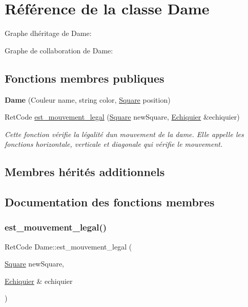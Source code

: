 \hypertarget{classDame}{}\section{Référence de la classe Dame}
\label{classDame}


Graphe d\textquotesingle{}héritage de Dame\+:


Graphe de collaboration de Dame\+:
\subsection*{Fonctions membres publiques}
\begin{DoxyCompactItemize}
\item 
\mbox{\label{classDame_ad4f00673b0a287a0ddf92682221fc961}} 
{\bfseries Dame} (Couleur name, string color, \hyperlink{classSquare}{Square} position)
\item 
Ret\+Code \hyperlink{classDame_a035c96c1763d0d111a4b4cde9678e75f}{est\+\_\+mouvement\+\_\+legal} (\hyperlink{classSquare}{Square} new\+Square, \hyperlink{classEchiquier}{Echiquier} \&echiquier)
\begin{DoxyCompactList}\small\item\em Cette fonction vérifie la légalité d\textquotesingle{}un mouvement de la dame. Elle appelle les fonctions horizontale, verticale et diagonale qui vérifie le mouvement. \end{DoxyCompactList}\end{DoxyCompactItemize}
\subsection*{Membres hérités additionnels}


\subsection{Documentation des fonctions membres}
\mbox{\label{classDame_a035c96c1763d0d111a4b4cde9678e75f}} 
\subsubsection{\texorpdfstring{est\+\_\+mouvement\+\_\+legal()}{est\_mouvement\_legal()}}
{\footnotesize\ttfamily Ret\+Code Dame\+::est\+\_\+mouvement\+\_\+legal (\begin{DoxyParamCaption}\item[{\hyperlink{classSquare}{Square}}]{new\+Square,  }\item[{\hyperlink{classEchiquier}{Echiquier} \&}]{echiquier }\end{DoxyParamCaption})\hspace{0.3cm}{\ttfamily [virtual]}}



